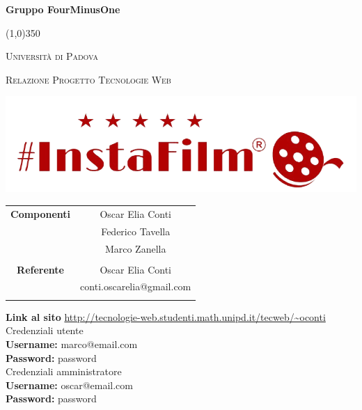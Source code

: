 \documentclass[a4paper,12pt]{article}
\author{Oscar Elia Conti, Federico Tavella, Marco Zanella}
\date{05/02/2016}
\begin{document}
	\begin{titlepage}
		\centering
		
		\vspace{1cm}
		{\huge\bfseries Gruppo FourMinusOne\par}
		\line(1,0){350} \\
		{\scshape\LARGE Università di Padova \par}
		\vspace{0.5cm}
		{\scshape\Large Relazione Progetto Tecnologie Web\par}
		\vspace{0.5cm}
		\includegraphics[scale=0.75]{immagini/logo.png}	 \\	
		\vspace{0.5cm}

\begin{tabular}{c|c}

{\hfill\textbf{Componenti}} & Oscar Elia Conti \parbox[t]{5cm}{} \\ & Federico Tavella \parbox[t]{5cm}{} \\ & Marco Zanella \parbox[t]{5cm}{} \\ \\

{\hfill\textbf{Referente}} & Oscar Elia Conti \parbox[t]{5cm}{} \\ & conti.oscarelia@gmail.com \\ \\


\end{tabular}
\vspace{0.5cm}


\textbf{Link al sito}
\url{http://tecnologie-web.studenti.math.unipd.it/tecweb/~oconti} \\
		\vspace{0.5cm}
		Credenziali utente\\
		\textbf{Username: } marco@email.com\\
		\textbf{Password: } password\\
		\vspace{0.5cm}
		Credenziali amministratore\\
		\textbf{Username: } oscar@email.com\\
		\textbf{Password: } password\\
		
		
		
\end{titlepage}
\end{document}
